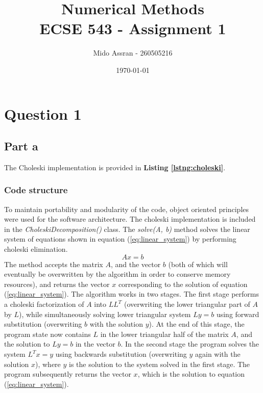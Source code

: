 \documentclass[11pt]{amsart}
\title{Numerical Methods\\ECSE 543 - Assignment 1}
\author{Mido Assran - 260505216}
\date{\today}                                           %
\begin{document}
\maketitle


\section*{Question 1}

\subsection*{Part a}
The Choleski implementation is provided in \textbf{Listing \ref{lstng:choleski}}.

\subsubsection*{Code structure} To maintain portability and modularity of the code, object oriented principles were used for the software architecture. The choleski implementation is included in the \textit{CholeskiDecomposition()} class. The \textit{solve(A, b)} method solves the linear system of equations shown in equation (\ref{eq:linear_system}) by performing choleski elimination. 
\begin{equation}\label{eq:linear_system}
Ax = b
\end{equation}
The method accepts the matrix $A$, and the vector $b$ (both of which will eventually be overwritten by the algorithm in order to conserve memory resources), and returns the vector $x$ corresponding to the solution of equation (\ref{eq:linear_system}). The algorithm works in two stages. The first stage performs a choleski factorization of $A$ into $L L^T$ (overwriting the lower triangular part of $A$ by $L$), while simultaneously solving lower triangular system $Ly = b$ using forward substitution (overwriting $b$ with the solution $y$). At the end of this stage, the program state now contains $L$ in the lower triangular half of the matrix $A$, and the solution to $Ly=b$ in the vector $b$. In the second stage the program solves the system $L^Tx = y$ using backwards substitution (overwriting $y$ again with the solution $x$), where $y$ is the solution to the system solved in the first stage. The program subsequently returns the vector $x$, which is the solution to equation (\ref{eq:linear_system}).
\end{document}
